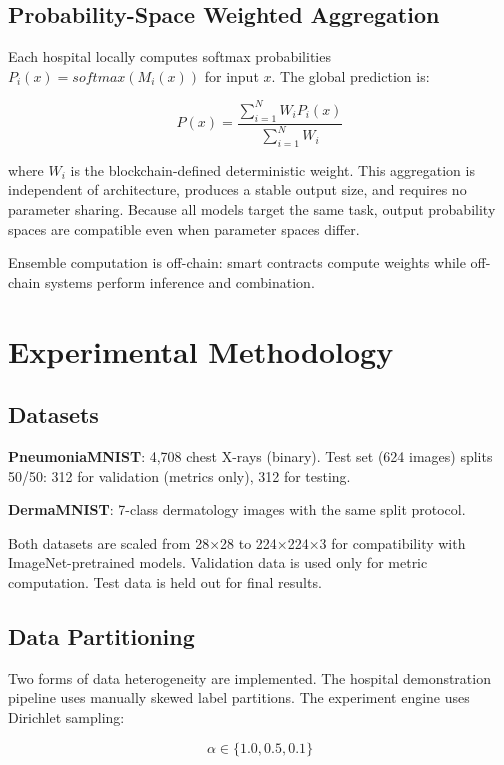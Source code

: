 \documentclass[conference]{IEEEtran}
\begin{document}
\subsection{Probability-Space Weighted Aggregation}

Each hospital locally computes softmax probabilities $P_i(x) = softmax(M_i(x))$ for input $x$. The global prediction is:

\begin{equation}
P(x)=\frac{\sum_{i=1}^{N}W_iP_i(x)}{\sum_{i=1}^{N}W_i}
\end{equation}

where $W_i$ is the blockchain-defined deterministic weight. This aggregation is independent of architecture, produces a stable output size, and requires no parameter sharing. Because all models target the same task, output probability spaces are compatible even when parameter spaces differ.

Ensemble computation is off-chain: smart contracts compute weights while off-chain systems perform inference and combination.

\section{Experimental Methodology}

\subsection{Datasets}

\textbf{PneumoniaMNIST}: 4,708 chest X-rays (binary). Test set (624 images) splits 50/50: 312 for validation (metrics only), 312 for testing.

\textbf{DermaMNIST}: 7-class dermatology images with the same split protocol.

Both datasets are scaled from 28×28 to 224×224×3 for compatibility with ImageNet-pretrained models. Validation data is used only for metric computation. Test data is held out for final results.

\subsection{Data Partitioning}

Two forms of data heterogeneity are implemented. The hospital demonstration pipeline uses manually skewed label partitions. The experiment engine uses Dirichlet sampling:

\begin{equation}
\alpha \in \{1.0,0.5,0.1\}
\end{equation}
\end{document}
